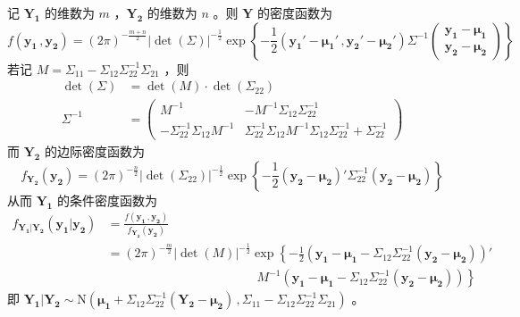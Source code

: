 \documentclass[12pt,hyperref,]{ctexart}
\begin{document}
记 \(\boldsymbol{Y_1}\) 的维数为 \(m\) ，\(\boldsymbol{Y_2}\) 的维数为
\(n\) 。则 \(\boldsymbol{Y}\) 的密度函数为 \begin{equation*}
f(\boldsymbol{y_1}\, ,\boldsymbol{y_2})=(2\pi)^{-\frac{m+n}{2}}|\det(\Sigma)|^{-\frac 12}\exp\left\{-\frac 12(\boldsymbol{y_1}'-\boldsymbol{\mu_1}'\, ,\boldsymbol{y_2}'-\boldsymbol{\mu_2}')\Sigma^{-1}
\begin{pmatrix}
\boldsymbol{y_1}-\boldsymbol{\mu_1} \\
\boldsymbol{y_2}-\boldsymbol{\mu_2}
\end{pmatrix}
\right\}
\end{equation*}若记
\(M=\Sigma_{11}-\Sigma_{12}\Sigma_{22}^{-1}\Sigma_{21}\) ，则
\begin{equation*}
\begin{aligned}
\det(\Sigma)&=\det(M)\cdot \det(\Sigma_{22}) \\
\Sigma^{-1}&=
\begin{pmatrix}
M^{-1} & -M^{-1}\Sigma_{12}\Sigma_{22}^{-1} \\
-\Sigma_{22}^{-1}\Sigma_{12}M^{-1} & \Sigma_{22}^{-1}\Sigma_{12}M^{-1}\Sigma_{12}\Sigma_{22}^{-1}+\Sigma_{22}^{-1}
\end{pmatrix}
\end{aligned}
\end{equation*}而 \(\boldsymbol{Y_2}\) 的边际密度函数为
\begin{equation*}
f_{\boldsymbol{Y_2}}(\boldsymbol{y_2})=(2\pi)^{-\frac n2}|\det(\Sigma_{22})|^{-\frac 12}\exp\left\{-\frac 12 (\boldsymbol{y_2}-\boldsymbol{\mu_2})'\Sigma_{22}^{-1}(\boldsymbol{y_2}-\boldsymbol{\mu_2})\right\}
\end{equation*}从而 \(\boldsymbol{Y_1}\) 的条件密度函数为
\begin{equation*}
\begin{aligned}
f_{\boldsymbol{Y_1}|\boldsymbol{Y_2}}(\boldsymbol{y_1}|\boldsymbol{y_2})&=\frac{f(\boldsymbol{y_1}\, ,\boldsymbol{y_2})}{f_{\boldsymbol{Y_2}}(\boldsymbol{y_2})} \\
&=(2\pi)^{-\frac m2}|\det(M)|^{-\frac 12}\exp\left\{-\frac 12 \left(\boldsymbol{y_1}-\boldsymbol{\mu_1}-\Sigma_{12}\Sigma_{22}^{-1}(\boldsymbol{y_2}-\boldsymbol{\mu_2})\right)'\right. \\
& \hspace{12em}\left. M^{-1}\left(\boldsymbol{y_1}-\boldsymbol{\mu_1}-\Sigma_{12}\Sigma_{22}^{-1}(\boldsymbol{y_2}-\boldsymbol{\mu_2})\right)\right\}
\end{aligned}
\end{equation*}即
\(\boldsymbol{Y_1}|\boldsymbol{Y_2}\sim\mathrm{N}\left(\boldsymbol{\mu_1}+\Sigma_{12}\Sigma_{22}^{-1}(\boldsymbol{Y_2}-\boldsymbol{\mu_2})\, ,\Sigma_{11}-\Sigma_{12}\Sigma_{22}^{-1}\Sigma_{21}\right)\)
。
\end{document}
